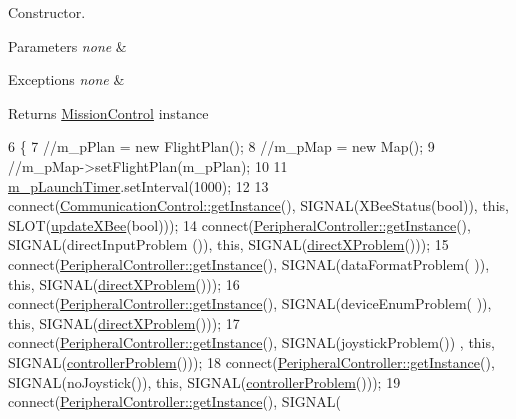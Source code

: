 Constructor. 


\begin{DoxyParams}{Parameters}
{\em none} & \\
\hline
\end{DoxyParams}

\begin{DoxyExceptions}{Exceptions}
{\em none} & \\
\hline
\end{DoxyExceptions}
\begin{DoxyReturn}{Returns}
\hyperlink{a00010}{Mission\-Control} instance 
\end{DoxyReturn}

\begin{DoxyCode}
6 \{
7         \textcolor{comment}{//m\_pPlan = new FlightPlan();}
8         \textcolor{comment}{//m\_pMap = new Map();}
9         \textcolor{comment}{//m\_pMap->setFlightPlan(m\_pPlan);}
10 
11     \hyperlink{a00010_ab3860e046790d0106c5c59d2947c4a24}{m\_pLaunchTimer}.setInterval(1000);
12 
13     connect(\hyperlink{a00001_afebd43c1f2afd7ec0eb35f99e50f0964}{CommunicationControl::getInstance}(), SIGNAL(XBeeStatus(\textcolor{keywordtype}{bool})),
       \textcolor{keyword}{this}, SLOT(\hyperlink{a00010_af5f2c7705408cb9400ff6f2d64eabf26}{updateXBee}(\textcolor{keywordtype}{bool})));
14     connect(\hyperlink{a00011_a81bd14f0b39bba2433355ec26f833270}{PeripheralController::getInstance}(), SIGNAL(directInputProblem
      ()), \textcolor{keyword}{this}, SIGNAL(\hyperlink{a00010_a1ce8df6c21f65fcfbeb3f6852600349e}{directXProblem}()));
15     connect(\hyperlink{a00011_a81bd14f0b39bba2433355ec26f833270}{PeripheralController::getInstance}(), SIGNAL(dataFormatProblem(
      )), \textcolor{keyword}{this}, SIGNAL(\hyperlink{a00010_a1ce8df6c21f65fcfbeb3f6852600349e}{directXProblem}()));
16     connect(\hyperlink{a00011_a81bd14f0b39bba2433355ec26f833270}{PeripheralController::getInstance}(), SIGNAL(deviceEnumProblem(
      )), \textcolor{keyword}{this}, SIGNAL(\hyperlink{a00010_a1ce8df6c21f65fcfbeb3f6852600349e}{directXProblem}()));
17     connect(\hyperlink{a00011_a81bd14f0b39bba2433355ec26f833270}{PeripheralController::getInstance}(), SIGNAL(joystickProblem())
      , \textcolor{keyword}{this}, SIGNAL(\hyperlink{a00010_acda62f445580e9296041e59a2d81fc77}{controllerProblem}()));
18     connect(\hyperlink{a00011_a81bd14f0b39bba2433355ec26f833270}{PeripheralController::getInstance}(), SIGNAL(noJoystick()), \textcolor{keyword}{
      this}, SIGNAL(\hyperlink{a00010_acda62f445580e9296041e59a2d81fc77}{controllerProblem}()));
19     connect(\hyperlink{a00011_a81bd14f0b39bba2433355ec26f833270}{PeripheralController::getInstance}(), SIGNAL(

\end{DoxyCode}
